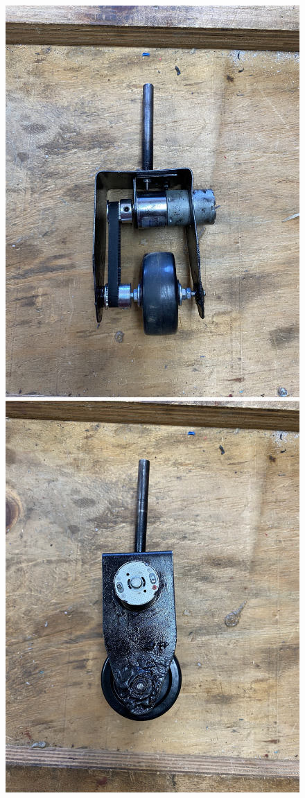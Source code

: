 \begin{figure}[H]
    \centering
    \includegraphics[scale = 0.07]{Figures/wheelFRAME1.jpg}
    \includegraphics[scale = 0.07]{Figures/wheelFRAME2.jpg}

\end{figure}
